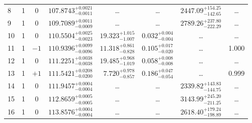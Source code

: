 \begin{table*}[!]
\begin{tabular}{llcrrlrc}
8 & 1 & 0 & $    107.8743_{-      0.0011}^{+      0.0021}$ & \multicolumn{1}{c}{\dots} & \multicolumn{1}{c}{\dots} & $     2447.09_{-      142.65}^{+      154.25}$ & \dots \\[1pt]
9 & 1 & 0 & $    109.7089_{-      0.0009}^{+      0.0011}$ & \multicolumn{1}{c}{\dots} & \multicolumn{1}{c}{\dots} & $     2789.26_{-      222.29}^{+      237.80}$ & \dots \\[1pt]
10 & 1 & 0 & $    110.5504_{-      0.0023}^{+      0.0025}$ & $      19.323_{-       1.007}^{+       1.015}$ & $       0.032_{-       0.004}^{+       0.004}$ & \multicolumn{1}{c}{\dots} & \dots \\[1pt]
11 & 1 & $-1$ & $    110.9396_{-      0.0096}^{+      0.0099}$ & $      11.318_{-       0.828}^{+       0.861}$ & $       0.105_{-       0.020}^{+       0.017}$ & \multicolumn{1}{c}{\dots} & 1.000 \\[1pt]
12 & 1 & 0 & $    111.2251_{-      0.0038}^{+      0.0038}$ & $      19.485_{-       1.019}^{+       0.968}$ & $       0.058_{-       0.008}^{+       0.008}$ & \multicolumn{1}{c}{\dots} & \dots \\[1pt]
13 & 1 & $+1$ & $    111.5421_{-      0.0200}^{+      0.0208}$ & $       7.720_{-       0.857}^{+       0.978}$ & $       0.186_{-       0.054}^{+       0.047}$ & \multicolumn{1}{c}{\dots} & 0.999\\[1pt] 
14 & 1 & 0 & $    111.9457_{-      0.0004}^{+      0.0004}$ & \multicolumn{1}{c}{\dots} & \multicolumn{1}{c}{\dots} & $     2339.82_{-      144.75}^{+      143.83}$ & \dots \\[1pt]
15 & 1 & 0 & $    112.8659_{-      0.0005}^{+      0.0005}$ & \multicolumn{1}{c}{\dots} & \multicolumn{1}{c}{\dots} & $     3143.99_{-      211.25}^{+      245.20}$ & \dots \\[1pt]
16 & 1 & 0 & $    113.8576_{-      0.0004}^{+      0.0004}$ & \multicolumn{1}{c}{\dots} & \multicolumn{1}{c}{\dots} & $     2618.40_{-      198.89}^{+      179.24}$ & \dots \\[1pt]


\end{tabular}
\end{table*}
